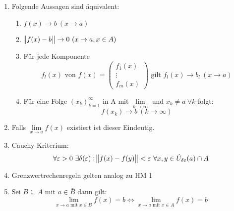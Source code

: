 \begin{enumerate}[label= (\alph*)]
    \item Folgende Aussagen sind äquivalent:
        \begin{enumerate}
            \item $f(x) \rightarrow  b\ (x \rightarrow a)$
            \item $\norm{f(x) - b} \rightarrow 0\ (x \rightarrow a, x \in A)$
            \item Für jede Komponente
                \begin{equation*}
                    f_l(x) \text{ von } f(x) =
                    \begin{pmatrix}
                        f_1(x)\\
                        \vdots \\
                        f_m(x)
                    \end{pmatrix}
                    \text{ gilt }
                    f_l(x) \rightarrow b_l\ (x \rightarrow a)
                \end{equation*}
            \item Für eine Folge ${(x_k)}_{k=1}^\infty$ in A mit
                $\lim\limits_{k \rightarrow \infty}$ und $x_k \neq a\ \forall k$ folgt:
                \begin{equation*}
                        f(x_k) \rightarrow b\ (k \rightarrow \infty)
                \end{equation*}
        \end{enumerate}
    \item Falls $\lim\limits_{x \rightarrow a} f(x)$ existiert ist dieser
        Eindeutig.
    \item Cauchy-Kriterium:
        \begin{equation*}
            \forall \varepsilon > 0\ \exists \delta(\varepsilon):
            \norm{f(x) -f(y)}<\varepsilon\ \forall x,y \in
            \dot{U}_{\delta{\varepsilon}}(a) \cap A
        \end{equation*}
    \item Grenzwertrechenregeln gelten analog zu HM 1
    \item Sei $B \subseteq A$ mit $a \in \bar{B}$ dann gilt:
        \begin{equation*}
            \lim_{x \rightarrow a \text{ mit } x \in B} f(x) = b \Leftrightarrow
            \lim_{x \rightarrow a \text{ mit } x \in A} f(x) = b
        \end{equation*}
\end{enumerate}

